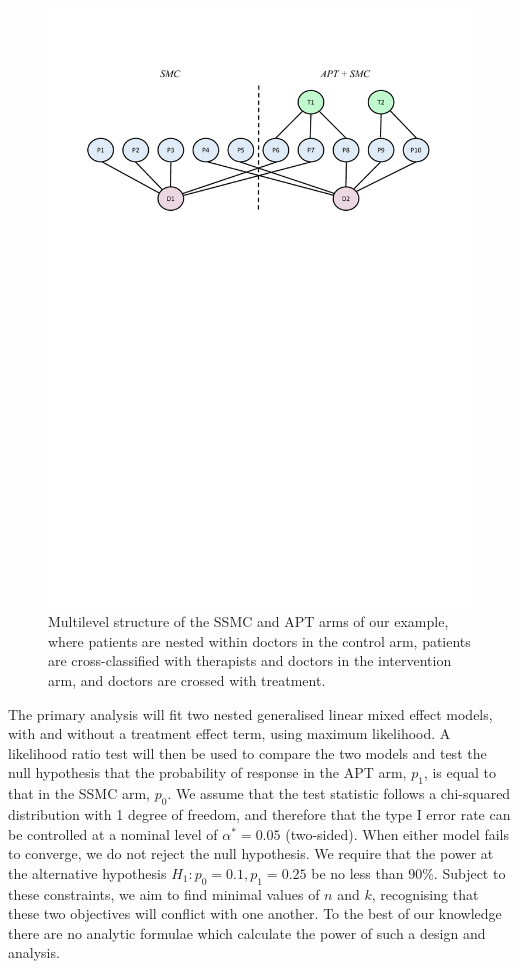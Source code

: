 \documentclass{article} %
\begin{document}
\begin{figure}
\centering
\includegraphics[scale=0.7, trim={1.9cm 19cm 0 0}, clip]{./Figures/ex1_structure.pdf}
\caption{Multilevel structure of the SSMC and APT arms of our example, where patients are nested within doctors in the control arm, patients are cross-classified with therapists and doctors in the intervention arm, and doctors are crossed with treatment.}
\label{fig:ex1_structure}
\end{figure}

The primary analysis will fit two nested generalised linear mixed effect models, with and without a treatment effect term, using maximum likelihood. A likelihood ratio test will then be used to compare the two models and test the null hypothesis that the probability of response in the APT arm, $p_1$, is equal to that in the SSMC arm, $p_0$. We assume that the test statistic follows a chi-squared distribution with 1 degree of freedom, and therefore that the type I error rate can be controlled at a nominal level of $\alpha^* = 0.05$ (two-sided). When either model fails to converge, we do not reject the null hypothesis. We require that the power at the alternative hypothesis $H_1: p_0=0.1, p_1=0.25$ be no less than 90\%. Subject to these constraints, we aim to find minimal values of $n$ and $k$, recognising that these two objectives will conflict with one another. To the best of our knowledge there are no analytic formulae which calculate the power of such a design and analysis. 
\end{document}
